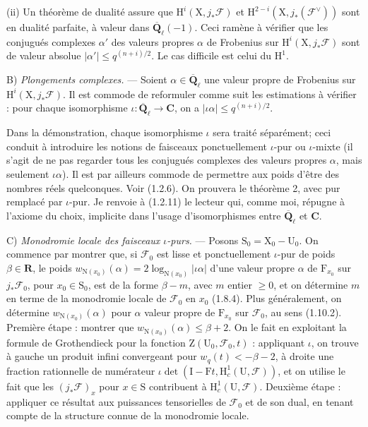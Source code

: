 \documentclass[11pt,leqno]{article}
\begin{document}
(ii) Un théorème de dualité assure que \(\mathrm{H}^i(\mathrm{X},j_*\mathscr{F})\) et \(\mathrm{H}^{2-i}(\mathrm{X},j_*(\mathscr{F}^{\vee}))\) sont en dualité parfaite, à valeur dans \(\overline{\mathbf{Q}}_\ell(-1)\). Ceci ramène à vérifier que les conjugués complexes \(\alpha'\) des valeurs propres \(\alpha\) de Frobenius sur \(\mathrm{H}^i(\mathrm{X},j_*\mathscr{F})\) sont de valeur absolue \(|\alpha'|\leq q^{(n+i)/2}\). Le cas difficile est celui du \(\mathrm{H}^1\).

B) \textit{Plongements complexes.} — Soient \(\alpha\in\overline{\mathbf{Q}}_\ell\) une valeur propre de Frobenius sur \(\mathrm{H}^i(\mathrm{X},j_*\mathscr{F})\). Il est commode de reformuler comme suit les estimations à vérifier : pour chaque isomorphisme \(\iota:\overline{\mathbf{Q}}_\ell\to\mathbf{C}\), on a \(|\iota\alpha|\leq q^{(n+i)/2}\).

Dans la démonstration, chaque isomorphisme \(\iota\) sera traité séparément; ceci conduit à introduire les notions de faisceaux ponctuellement \(\iota\)-pur ou \(\iota\)-mixte (il s’agit de ne pas regarder tous les conjugués complexes des valeurs propres \(\alpha\), mais seulement \(\iota\alpha\)). Il est par ailleurs commode de permettre aux poids d’être des nombres réels quelconques. Voir (1.2.6). On prouvera le théorème 2, avec pur remplacé par \(\iota\)-pur. Je renvoie à (1.2.11) le lecteur qui, comme moi, répugne à l’axiome du choix, implicite dans l’usage d’isomorphismes entre \(\overline{\mathbf{Q}}_\ell\) et \(\mathbf{C}\).

C) \textit{Monodromie locale des faisceaux \(\iota\)-purs.} — Posons \(\mathrm{S}_0=\mathrm{X}_0-\mathrm{U}_0\). On commence par montrer que, si \(\mathscr{F}_0\) est lisse et ponctuellement \(\iota\)-pur de poids \(\beta\in\mathbf{R}\), le poids \(w_{\mathrm{N}(x_0)}(\alpha)=2\log_{\mathrm{N}(x_0)}|\iota\alpha|\) d’une valeur propre \(\alpha\) de \(\mathrm{F}_{x_0}\) sur \(j_*\mathscr{F}_0\), pour \(x_0\in\mathrm{S}_0\), est de la forme \(\beta-m\), avec \(m\) entier \(\geq 0\), et on détermine \(m\) en terme de la monodromie locale de \(\mathscr{F}_0\) en \(x_0\) (1.8.4). Plus généralement, on détermine \(w_{\mathrm{N}(x_0)}(\alpha)\) pour \(\alpha\) valeur propre de \(\mathrm{F}_{x_0}\) sur \(\mathscr{F}_0\), au sens (1.10.2). Première étape : montrer que \(w_{\mathrm{N}(x_0)}(\alpha)\leq\beta+2\). On le fait en exploitant la formule de Grothendieck pour la fonction \(\mathrm{Z}(\mathrm{U}_0,\mathscr{F}_0,t)\) : appliquant \(\iota\), on trouve à gauche un produit infini convergeant pour \(w_q(t)<-\beta-2\), à droite une fraction rationnelle de numérateur \(\iota\det(\mathrm{I}-\mathrm{F}t,\mathrm{H}_c^1(\mathrm{U},\mathscr{F}))\), et on utilise le fait que les \((j_*\mathscr{F})_x\) pour \(x\in\mathrm{S}\) contribuent à \(\mathrm{H}_c^1(\mathrm{U},\mathscr{F})\). Deuxième étape : appliquer ce résultat aux puissances tensorielles de \(\mathscr{F}_0\) et de son dual, en tenant compte de la structure connue de la monodromie locale.
\end{document}
